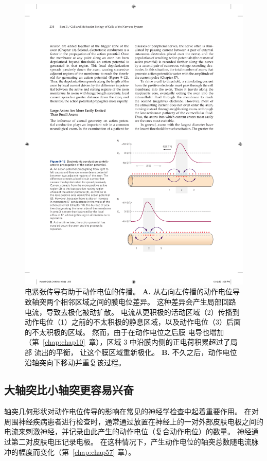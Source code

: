\begin{figure}[htbp]
	\centering
	\includegraphics[width=0.75\linewidth]{chap09/fig_9_12}
	\caption{电紧张传导有助于动作电位的传播。
		\textbf{A.} 从右向左传播的动作电位导致轴突两个相邻区域之间的膜电位差异。
		这种差异会产生局部回路电流，导致去极化被动扩散。
		电流从更积极的活动区域（2）传播到动作电位（1）之前的不太积极的静息区域，以及动作电位（3）后面的不太积极的区域。
		然而，由于在动作电位之后膜  电导也增加（第~\ref{chap:chap10}~章），区域 3 中沿膜内侧的正电荷积累超过了局部  流出的平衡， 让这个膜区域重新极化。
		\textbf{B.} 不久之后，动作电位沿轴突向下移动并重复该过程。}
	\label{fig:9_12}
\end{figure}



\subsection{大轴突比小轴突更容易兴奋}

轴突几何形状对动作电位传导的影响在常见的神经学检查中起着重要作用。
在对周围神经疾病患者进行检查时，通常通过放置在神经上的一对外部皮肤电极之间的电流来刺激神经，并记录由此产生的动作电位（复合动作电位）的数量。
神经通过第二对皮肤电压记录电极。
在这种情况下，产生动作电位的轴突总数随电流脉冲的幅度而变化（第~\ref{chap:chap57} 章）。



